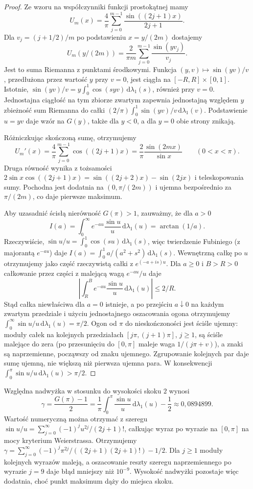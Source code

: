 \begin{proof}
Ze wzoru na współczynniki funkcji prostokątnej
mamy
\[
 U_m(x)=\frac4\pi\sum_{j=0}^{m-1}
 \frac{\sin((2j+1)x)}{2j+1}.
\]
Dla $v_j=(j+1/2)/m$ po podstawieniu
$x=y/(2m)$ dostajemy
\[
 U_m(y/(2m))=\frac2{\pi m}
 \sum_{j=0}^{m-1}\frac{\sin(yv_j)}{v_j}.
\]
Jest to suma Riemanna z punktami środkowymi.
Funkcja $(y,v)\mapsto \sin(yv)/v$,
przedłużona przez wartość $y$ przy $v=0$,
jest ciągła na $[-R,R]\times[0,1]$.
Istotnie, $\sin(yv)/v=y\int_0^1\cos(syv)\,
\mathrm d\lambda_1(s)$, również przy $v=0$.
Jednostajna ciągłość na tym zbiorze zwartym
zapewnia jednostajną względem $y$ zbieżność
sum Riemanna do całki
$(2/\pi)\int_0^1\sin(yv)/v\,\mathrm d\lambda_1(v)$.
Podstawienie $u=yv$ daje wzór na $G(y)$,
także dla $y<0$, a dla $y=0$ obie strony znikają.

Różniczkując skończoną sumę, otrzymujemy
\[
 U_m'(x)=\frac4\pi\sum_{j=0}^{m-1}\cos((2j+1)x)
 =\frac2\pi\frac{\sin(2mx)}{\sin x}
 \qquad(0<x<\pi).
\]
Druga równość wynika z tożsamości
$2\sin x\cos((2j+1)x)=\sin((2j+2)x)-\sin(2jx)$
i teleskopowania sumy. Pochodna jest dodatnia
na $(0,\pi/(2m))$ i ujemna bezpośrednio
za $\pi/(2m)$, co daje pierwsze maksimum.

Aby uzasadnić ścisłą nierówność $G(\pi)>1$,
zauważmy, że dla $a>0$
\[
 I(a)=\int_0^\infty e^{-au}\frac{\sin u}{u}
 \,\mathrm d\lambda_1(u)=\arctan(1/a).
\]
Rzeczywiście, $\sin u/u=\int_0^1\cos(su)\,
\mathrm d\lambda_1(s)$, więc twierdzenie Fubiniego
(z majorantą $e^{-au}$) daje
$I(a)=\int_0^1a/(a^2+s^2)\,\mathrm d\lambda_1(s)$.
Wewnętrzną całkę po $u$ otrzymujemy jako
część rzeczywistą całki z $e^{(-a+is)u}$.
Dla $a\ge0$ i $B>R>0$ całkowanie przez części
z malejącą wagą $e^{-au}/u$ daje
\[
 \left|\int_R^B e^{-au}\frac{\sin u}{u}
 \,\mathrm d\lambda_1(u)\right|\le 2/R.
\]
Stąd całka niewłaściwa dla $a=0$ istnieje,
a po przejściu $a\downarrow0$ na każdym
zwartym przedziale i użyciu jednostajnego
oszacowania ogona otrzymujemy
$\int_0^\infty\sin u/u\,\mathrm d\lambda_1(u)=\pi/2$.
Ogon od $\pi$ do nieskończoności jest ściśle
ujemny: moduły całek na kolejnych przedziałach
$[j\pi,(j+1)\pi]$, $j\ge1$, są ściśle malejące
do zera (po przesunięciu do $[0,\pi]$ maleje
waga $1/(j\pi+v)$), a znaki są naprzemienne,
począwszy od znaku ujemnego. Zgrupowanie
kolejnych par daje sumę ujemną, nie większą
niż pierwsza ujemna para. W konsekwencji
$\int_0^\pi\sin u/u\,\mathrm d\lambda_1(u)>\pi/2$.
\end{proof}

Względna nadwyżka w stosunku do wysokości skoku $2$
wynosi
\[
 \gamma=\frac{G(\pi)-1}{2}
 =\frac1\pi\int_0^\pi\frac{\sin u}{u}
 \,\mathrm d\lambda_1(u)-\frac12
 \approx0{,}0894899.
\]
Wartość numeryczną można otrzymać z szeregu
$\sin u/u=\sum_{j=0}^\infty(-1)^ju^{2j}/(2j+1)!$,
całkując wyraz po wyrazie na $[0,\pi]$
na mocy kryterium Weierstrassa. Otrzymujemy
$\gamma=\sum_{j=0}^\infty
(-1)^j\pi^{2j}/((2j+1)(2j+1)!)-1/2$.
Dla $j\ge1$ moduły kolejnych wyrazów maleją,
a oszacowanie reszty szeregu naprzemiennego
po wyrazie $j=9$ daje błąd mniejszy niż $10^{-9}$.
Wysokość nadwyżki pozostaje więc dodatnia,
choć punkt maksimum dąży do miejsca skoku.

